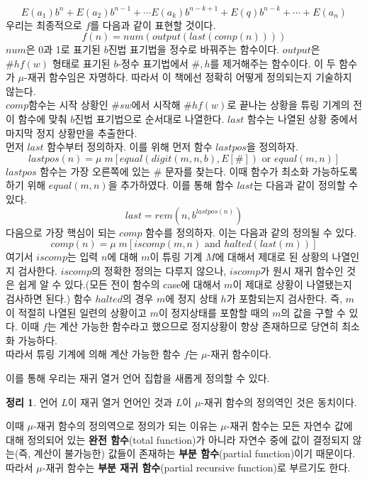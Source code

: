 \documentclass[b5paper, 10pt]{book}
\theoremstyle{definition}
\newtheorem{thm}[defn]{정리}
\newenvironment{pf*}{\pushQED{\qed}\pf}{\popQED\endpf}
\begin{document}
\begin{pf*}
    $$E(a_1)b^n + E(a_2)b^{n-1} + \cdots E(a_k)b^{n-k+1} + E(q)b^{n-k} + \cdots + E(a_n)$$
    우리는 최종적으로 $f$를 다음과 같이 표현할 것이다.
    $$f(n) = num(output(last(comp(n))))$$
    $num$은 0과 1로 표기된 $b$진법 표기법을 정수로 바꿔주는 함수이다. 
    $output$은 $\# h f(w)$ 형태로 표기된 $b$-정수 표기법에서 $\#, h$를 제거해주는 함수이다.
    이 두 함수가 $\mu$-재귀 함수임은 자명하다. 따라서 이 책에선 정확히 어떻게 정의되는지 기술하지 않는다.\\ 
    $comp$함수는 시작 상황인 $\# s w$에서 시작해 $\# h f(w)$로 끝나는 상황을 튜링 기계의 
    전이 함수에 맞춰 $b$진법 표기법으로 순서대로 나열한다. $last$ 함수는 나열된 상황 중에서 마지막 정지 상황만을
    추출한다. \\ 
    먼저 $last$ 함수부터 정의하자. 이를 위해 먼저 함수 $lastpos$을 정의하자. 
    $$lastpos(n)= \mu \; m [equal(digit(m,n,b),E[\#]) \text{ or } equal(m,n)]$$
    $lastpos$ 함수는 가장 오른쪽에 있는 $\#$ 문자를 찾는다. 이때 함수가 최소화 가능하도록 하기 위해
    $equal(m,n)$을 추가하였다. 이를 통해 함수 $last$는 다음과 같이 정의할 수 있다.
    $$last = rem(n,b^{lastpos(n)})$$ 
    다음으로 가장 핵심이 되는 $comp$ 함수를 정의하자. 이는 다음과 같의 정의될 수 있다.
    $$comp(n) = \mu \; m [iscomp(m,n) \text{ and } halted(last(m))]$$
    여기서 $iscomp$는 입력 $n$에 대해 $m$이 튜링 기계 $M$에 대해서 제대로 된 상황의 나열인지 검사한다. 
    $iscomp$의 정확한 정의는 다루지 않으나, $iscomp$가 원시 재귀 함수인 것은 쉽게 알 수 있다.(모든 전이 함수의
    case에 대해서 $m$이 제대로 상황이 나열됐는지 검사하면 된다.) 함수 $halted$의 경우 $m$에 
    정지 상태 $h$가 포함되는지 검사한다. 즉, $m$이 적절히 나열된 일련의 상황이고 $m$이 정지상태를 포함할 때의 
    $m$의 값을 구할 수 있다. 이때 $f$는 계산 가능한 함수라고 했으므로 정지상황이 항상 존재하므로 당연히 최소화 가능하다. \\ 
    따라서 튜링 기계에 의해 계산 가능한 함수 $f$는 $\mu$-재귀 함수이다. 
\end{pf*}
이를 통해 우리는 재귀 열거 언어 집합을 새롭게 정의할 수 있다.
\begin{thm}
    언어 $L$이 재귀 열거 언어인 것과 $L$이 $\mu$-재귀 함수의 정의역인 것은 동치이다. 
\end{thm}
이때 $\mu$-재귀 함수의 정의역으로 정의가 되는 이유는 $\mu$-재귀 함수는 모든 자연수 값에 대해
정의되어 있는 \textbf{완전 함수}(total function)가 아니라 자연수 중에 값이 결정되지 않는(즉, 
계산이 불가능한) 값들이 존재하는 \textbf{부분 함수}(partial function)이기 때문이다. 따라서 
$\mu$-재귀 함수는 \textbf{부분 재귀 함수}(partial recursive function)로 부르기도 한다.
\end{document}
